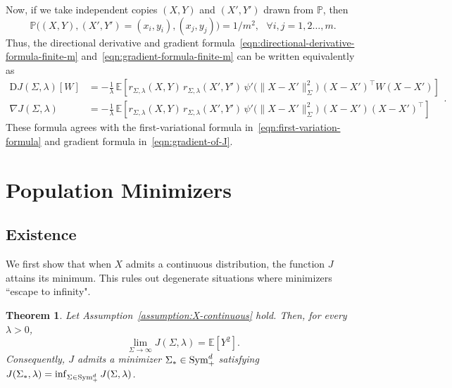 \documentclass[sn-mathphys-num]{sn-jnl}%
\numberwithin{equation}{section}
\newcommand{\E}{\mathbb{E}}
\renewcommand{\P}{\mathbb{P}}
\newcommand{\Sym}{{\rm \mathrm{Sym}}}
\theoremstyle{thmstyleone}%
\newtheorem{theorem}{Theorem}%
\theoremstyle{thmstyletwo}%
\theoremstyle{thmstylethree}%
\begin{document}
Now, if we take independent copies $(X,Y)$ and $(X',Y')$ drawn from $\P$, then
\[
\P\bigl((X,Y),(X',Y') = (x_i,y_i),(x_j,y_j)\bigr)= 1/m^2,~~~\forall i, j = 1, 2 \ldots, m.
\]
Thus, the directional derivative and gradient formula~\eqref{eqn:directional-derivative-formula-finite-m} 
and~\eqref{eqn:gradient-formula-finite-m} can be written equivalently as
\begin{equation*}
\begin{split}
	\mathrm{D}J(\Sigma,\lambda)[W]
	&=
	-\frac{1}{\lambda}\,
	\E\!\left[
		r_{\Sigma,\lambda}(X,Y)\,
		r_{\Sigma,\lambda}(X',Y')\,
		\psi'\!\bigl(\|X-X'\|_\Sigma^2\bigr)\,
		(X-X')^\top W (X-X')
	\right] \\
	\nabla J(\Sigma,\lambda)
	&=
	-\frac{1}{\lambda}\,
	\E\!\left[
		r_{\Sigma,\lambda}(X,Y)\,
		r_{\Sigma,\lambda}(X',Y')\,
		\psi'\!\bigl(\|X-X'\|_\Sigma^2\bigr)\,
		(X-X') (X-X')^\top
	\right]
\end{split} .
\end{equation*}
These formula agrees with the first-variational formula in~\eqref{eqn:first-variation-formula}
and gradient formula in~\eqref{eqn:gradient-of-J}. 



\section{Population Minimizers}
\label{sec:global-minimizers}

\subsection{Existence} 
\indent\indent
We first show that when $X$ admits a continuous distribution, the function $J$ attains its minimum. 
This rules out degenerate situations where minimizers ``escape to infinity". 

\vspace{.5em} 
\begin{theorem}
\label{theorem:existence-of-global-minimizers}
Let Assumption~\ref{assumption:X-continuous} hold. Then, for every $\lambda > 0$,
\begin{equation*}
	\lim_{\Sigma \to \infty} J(\Sigma, \lambda) = \E[Y^2]. 
\end{equation*}
Consequently, $J$ admits a minimizer $\Sigma_* \in \Sym_+^d$ satisfying $J(\Sigma_*, \lambda) = \inf_{\Sigma \in \Sym_+^d} J(\Sigma, \lambda)$.
\end{theorem}
\end{document}
